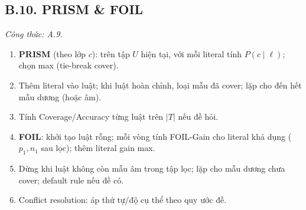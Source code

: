 \subsection*{B.10. PRISM \& FOIL}
\textit{Công thức: A.9.}
\begin{enumerate}
  \item \textbf{PRISM} (theo lớp \(c\)): trên tập \(U\) hiện tại, với mỗi literal tính \(P(c\mid\ell)\); chọn max (tie-break cover).
  \item Thêm literal vào luật; khi luật hoàn chỉnh, loại mẫu đã cover; lặp cho đến hết mẫu dương (hoặc âm).
  \item Tính Coverage/Accuracy từng luật trên \(|T|\) nếu đề hỏi.
  \item \textbf{FOIL}: khởi tạo luật rỗng; mỗi vòng tính FOIL-Gain cho literal khả dụng (\(p_1,n_1\) sau lọc); thêm literal gain max.
  \item Dừng khi luật không còn mẫu âm trong tập lọc; lặp cho mẫu dương chưa cover; default rule nếu đề có.
  \item Conflict resolution: áp thứ tự/độ cụ thể theo quy ước đề.
\end{enumerate}
